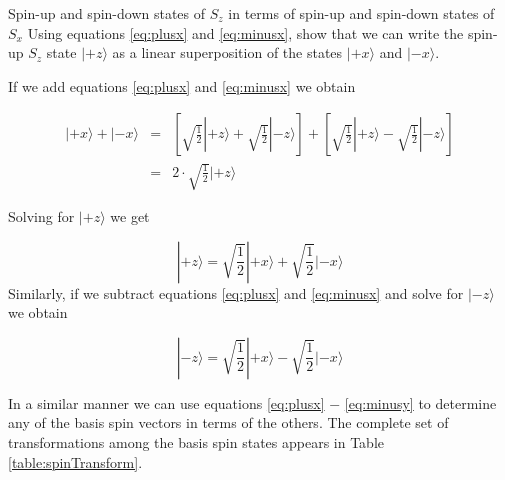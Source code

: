 \begin{example}{Spin-up and spin-down states of $S_z$ in terms of spin-up and spin-down states of $S_x$}
\label{exam:ztox}
Using equations \ref{eq:plusx} and \ref{eq:minusx}, show that we can write the spin-up $S_z$ state $|\mbox{$+z$}\rangle$ as a linear superposition of the states $|\mbox{$+x$}\rangle$ and $|\mbox{$-x$}\rangle$.

\solution If we add equations \ref{eq:plusx} and \ref{eq:minusx} we obtain

\begin{eqnarray}
|\mbox{$+x$}\rangle + |\mbox{$-x$}\rangle & = & \left[ \sqrt{\frac{1}{2}}|\mbox{$+z$}\rangle + \sqrt{\frac{1}{2}}|\mbox{$-z$}\rangle \right] + \left[ \sqrt{\frac{1}{2}}|\mbox{$+z$}\rangle - \sqrt{\frac{1}{2}}|\mbox{$-z$}\rangle \right] \nonumber\\
 & = & 2 \cdot \sqrt{\frac{1}{2}} |\mbox{$+z$}\rangle \nonumber
\end{eqnarray}

\noindent Solving for $|\mbox{$+z$}\rangle$ we get

\begin{equation}
|\mbox{$+z$}\rangle = \sqrt{\frac{1}{2}} |\mbox{$+x$}\rangle + \sqrt{\frac{1}{2}} |\mbox{$-x$}\rangle \nonumber
\end{equation}
Similarly, if we subtract equations \ref{eq:plusx} and \ref{eq:minusx} and solve for $|\mbox{$-z$}\rangle$ we obtain

\begin{equation}
|\mbox{$-z$}\rangle = \sqrt{\frac{1}{2}} |\mbox{$+x$}\rangle - \sqrt{\frac{1}{2}} |\mbox{$-x$}\rangle \nonumber
\end{equation}

In a similar manner we can use equations \ref{eq:plusx} $-$ \ref{eq:minusy} to determine any of the basis spin vectors in terms of the others.  The complete set of transformations among the basis spin states appears in Table \ref{table:spinTransform}.

\end{example}



